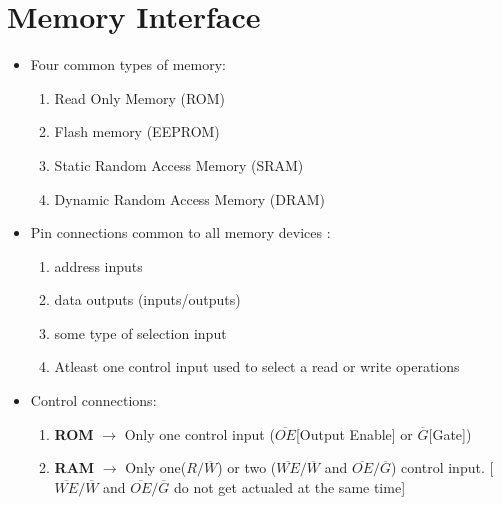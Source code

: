 \section{Memory Interface}
\begin{itemize}
  \item Four common types of memory:
  \begin{enumerate}
    \item Read Only Memory (ROM)
    \item Flash memory (EEPROM)
    \item Static Random Access Memory (SRAM)
    \item Dynamic Random Access Memory (DRAM)
  \end{enumerate}

  \item Pin connections common to all memory devices :
  \begin{enumerate}
    \item address inputs
    \item data outputs (inputs/outputs)
    \item some type of selection input
    \item Atleast one control input used to select a read or write operations
  \end{enumerate}
  \item Control connections:
  \begin{enumerate}
    \item \textbf{ROM} $\longrightarrow$ Only one control input ($\overline{OE}$[Output Enable] or $\overline{G}$[Gate])
    \item \textbf{RAM} $\longrightarrow$ Only one($R/\overline{W}$) or two ($\overline{WE}/\overline{W}$ and $\overline{OE}/\overline{G}$) control input. [$\overline{WE}/\overline{W}$ and $\overline{OE}/\overline{G}$ do not get actualed at the same time]
  \end{enumerate}
\end{itemize}

